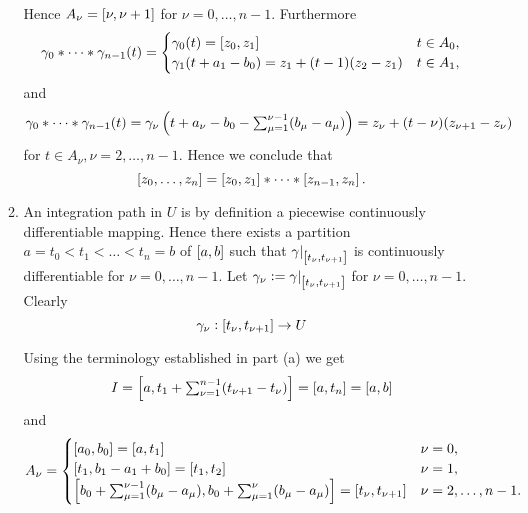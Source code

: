 \begin{enumerate}[label = \textbf{Exercise \arabic*.},wide = 0pt, itemsep=1.5ex]
\begin{enumerate}[label = (\alph*),wide = 0pt, itemsep=1.5ex]
			Hence $A_\nu = \intcc{\nu,\nu + 1}$ for $\nu = 0,\dots,n - 1$. Furthermore
			\begin{align*}
				\gamma_0 \ast \dots \ast \gamma_{n-1}(t) = \begin{cases}
					\gamma_0(t) = \intcc{z_0,z_1} & t \in A_0,\\
					\gamma_1(t + a_1 - b_0) = z_1 + (t - 1)(z_2 - z_1) & t \in A_1,\\	
				\end{cases}
			\end{align*}
			\noindent and
			\begin{equation}
				\textstyle\gamma_0 \ast \dots \ast \gamma_{n-1}(t) = \gamma_\nu\del{t + a_\nu - b_0 - \sum_{\mu = 1}^{\nu-1} (b_\mu - a_\mu)} = z_\nu + (t - \nu)(z_{\nu + 1} - z_\nu)
			\end{equation}
			\noindent for $t \in A_\nu, \nu = 2,\dots,n - 1$. Hence we conclude that
			\begin{equation}
				\intcc{z_0,\dots,z_n} = \intcc{z_0,z_1} \ast \dots \ast \intcc{z_{n-1},z_n}.
			\end{equation}
		\item An integration path in $U$ is by definition a piecewise continuously differentiable mapping. Hence there exists a partition $a = t_0 < t_1 < \dots < t_n = b$ of $\intcc{a,b}$ such that $\gamma\vert_{\intcc{t_\nu,t_{\nu + 1}}}$ is continuously differentiable for $\nu = 0,\dots,n-1$. Let $\gamma_{\nu} := \gamma\vert_{\intcc{t_\nu,t_{\nu + 1}}}$ for $\nu = 0,\dots,n-1$. Clearly
			\begin{equation}
				\gamma_\nu : \intcc{t_\nu,t_{\nu + 1}} \to U
			\end{equation}

			Using the terminology established in part (a) we get
			\begin{equation}
				\textstyle I = \intcc{a,t_1 + \sum_{\nu = 1}^{n-1}(t_{\nu + 1} - t_\nu)} = \intcc{a,t_n} = \intcc{a,b}
			\end{equation}
			\noindent and
			\begin{align*}
				A_\nu = \begin{cases}
					\intcc{a_0,b_0} = \intcc{a,t_1} & \nu = 0,\\
					\intcc{t_1,b_1 - a_1 + b_0} = \intcc{t_1,t_2} & \nu = 1,\\
					\intcc{b_0 + \sum_{\mu = 1}^{\nu-1} (b_\mu - a_\mu),b_0 + \sum_{\mu = 1}^{\nu}(b_\mu - a_\mu)} = \intcc{t_{\nu},t_{\nu + 1}} & \nu = 2,\dots,n - 1.
				\end{cases}
			\end{align*}


\end{enumerate}
\end{enumerate}
